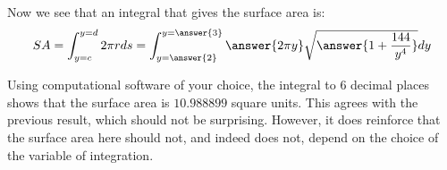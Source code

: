 \documentclass{ximera}
\begin{document}
\begin{exercise}
\begin{exercise}
Now we see that an integral that gives the surface area is: 
\[
SA= \int_{y=c}^{y=d} 2 \pi r ds = \int_{y=\answer{2}}^{y=\answer{3}} \answer{2 \pi y} \sqrt{\answer{1+\frac{144}{y^4}}} dy
\]

Using computational software of your choice, the integral to 6 decimal places shows that the surface area is $10.988899$ square units.  This agrees with the previous result, which should not be surprising.  However, it does reinforce that the surface area here should not, and indeed does not, depend on the choice of the variable of integration.

\end{exercise}



\end{exercise}
\end{document}
